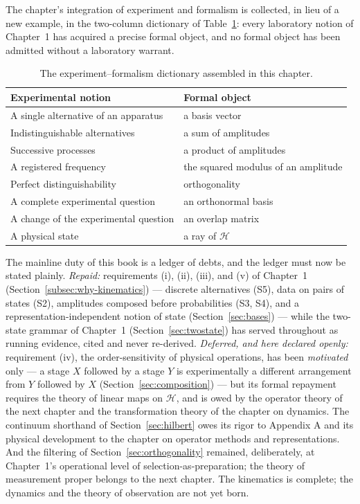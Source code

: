 The chapter's integration of experiment and formalism is collected, in lieu of a new example, in the two-column dictionary of Table~\ref{tab:ch2-dictionary}: every laboratory notion of Chapter~1 has acquired a precise formal object, and no formal object has been admitted without a laboratory warrant.
\begin{table}[htbp!]
    \centering
    \caption{The experiment--formalism dictionary assembled in this chapter.}
    \label{tab:ch2-dictionary}
    \begin{tabular}{ll}
        \toprule
        Experimental notion & Formal object \\
        \midrule
        A single alternative of an apparatus & a basis vector \\
        Indistinguishable alternatives & a sum of amplitudes \\
        Successive processes & a product of amplitudes \\
        A registered frequency & the squared modulus of an amplitude \\
        Perfect distinguishability & orthogonality \\
        A complete experimental question & an orthonormal basis \\
        A change of the experimental question & an overlap matrix \\
        A physical state & a ray of $\mathcal{H}$ \\
        \bottomrule
    \end{tabular}
\end{table}

The mainline duty of this book is a ledger of debts, and the ledger must now be stated plainly. \emph{Repaid:} requirements (i), (ii), (iii), and (v) of Chapter~1 (Section~\ref{subsec:why-kinematics}) --- discrete alternatives (S5), data on pairs of states (S2), amplitudes composed before probabilities (S3, S4), and a representation-independent notion of state (Section~\ref{sec:bases}) --- while the two-state grammar of Chapter~1 (Section~\ref{sec:twostate}) has served throughout as running evidence, cited and never re-derived. \emph{Deferred, and here declared openly:} requirement (iv), the order-sensitivity of physical operations, has been \emph{motivated} only --- a stage $X$ followed by a stage $Y$ is experimentally a different arrangement from $Y$ followed by $X$ (Section~\ref{sec:composition}) --- but its formal repayment requires the theory of linear maps on $\mathcal{H}$, and is owed by the operator theory of the next chapter and the transformation theory of the chapter on dynamics. The continuum shorthand of Section~\ref{sec:hilbert} owes its rigor to Appendix A and its physical development to the chapter on operator methods and representations. And the filtering of Section~\ref{sec:orthogonality} remained, deliberately, at Chapter~1's operational level of selection-as-preparation; the theory of measurement proper belongs to the next chapter. The kinematics is complete; the dynamics and the theory of observation are not yet born.


